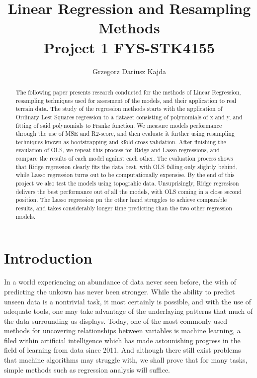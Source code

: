 \documentclass[a4paper, 10pt]{article}
\title{\Large Linear Regression and Resampling Methods \\	
		 \normalsize Project 1 FYS-STK4155}
\author{Grzegorz Dariusz Kajda}
\begin{document}
\maketitle

\begin{abstract}
	The following paper presents research conducted for the methods of Linear Regression, resampling techniques used for assesment of the models, and their application to real terrain data. The study of the regression methods starts with the application of Ordinary Lest Squares regression to a dataset consisting of polynomials of x and y, and fitting of said polynomials to Franke function. We measure models performance through the use of MSE and R2-score, and then evaluate it further using resampling techniques known as bootstrapping and kfold cross-validation. After finishing the evaulation of OLS, we repeat this process for Ridge and Lasso regressions, and compare the results of each model against each other. The evaluation process shows that Ridge regression clearly fits the data best, with OLS falling only slightly behind, while Lasso regression turns out to be computationally expensise.
By the end of this project we also test the models using topograhic data. Unsuprisingly, Ridge regresison delivers the best performance out of all the models, with OLS coming in a close second position. The Lasso regression pn the other hand struggles to achieve comparable results, and takes considerably longer time predicting than the two other regression models.       
\end{abstract}
\linespread{2.5}
\tableofcontents

\linespread{2.5}
\section{Introduction}
In a world experiencing an abundance of data never seen before, the wish of predicting the unkown has never been stronger. While the ability to predict unseen data is a nontrivial task, it most certainly is possible, and with the use of adequate tools, one may take advantage of the underlaying patterns that much of the data surrounding us displays. Today, one of the most commonly used methods for uncovering relationships between variables is machine learning, a filed within artificial intelligence which has made astounishing progress in the field of learning from data since 2011. And although there still exist problems that machine algorithms may struggle with, we shall prove that for many tasks, simple methods such as regression analysis will suffice.  
\end{document}
